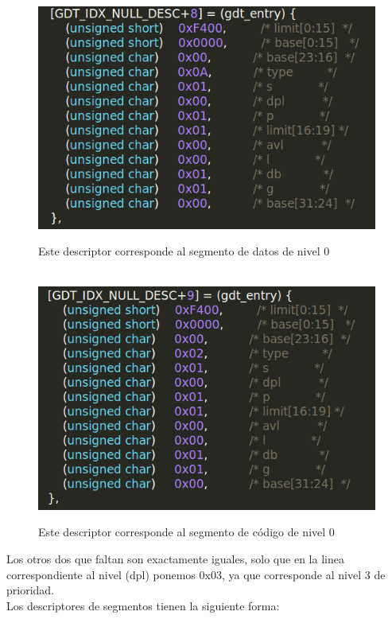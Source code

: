 \begin{figure}[H]
\begin{center}
  \includegraphics[width=\linewidth]{ejercicio1/GDTcodigo0.png}
  \caption{{\small Este descriptor corresponde al segmento de datos de nivel 0}} 
\endminipage\\
  \includegraphics[width=\linewidth]{ejercicio1/GDTdatos0.png}
  \caption{{\small Este descriptor corresponde al segmento de código de nivel 0}} 
\endminipage
\end{center}
\end{figure}

Los otros dos que faltan son exactamente iguales, solo que en la linea correspondiente al nivel (dpl) ponemos 0x03, ya que corresponde al nivel 3 de prioridad.
\\

Los descriptores de segmentos tienen la siguiente forma:
\\


